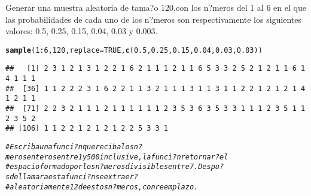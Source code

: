 \documentclass[10pt,a4paper]{article}\usepackage[]{graphicx}\usepackage[]{color}
\makeatletter
\newcommand{\hlnum}[1]{\textcolor[rgb]{0.686,0.059,0.569}{#1}}%
\newcommand{\hlcom}[1]{\textcolor[rgb]{0.678,0.584,0.686}{\textit{#1}}}%
\newcommand{\hlopt}[1]{\textcolor[rgb]{0,0,0}{#1}}%
\newcommand{\hlstd}[1]{\textcolor[rgb]{0.345,0.345,0.345}{#1}}%
\newcommand{\hlkwc}[1]{\textcolor[rgb]{0.333,0.667,0.333}{#1}}%
\newcommand{\hlkwd}[1]{\textcolor[rgb]{0.737,0.353,0.396}{\textbf{#1}}}%
\newenvironment{kframe}{%
 \def\at@end@of@kframe{}%
 \ifinner\ifhmode%
  \def\at@end@of@kframe{\end{minipage}}%
  \begin{minipage}{\columnwidth}%
 \fi\fi%
 \def\FrameCommand##1{\hskip\@totalleftmargin \hskip-\fboxsep
 \colorbox{shadecolor}{##1}\hskip-\fboxsep
     \hskip-\linewidth \hskip-\@totalleftmargin \hskip\columnwidth}%
 \MakeFramed {\advance\hsize-\width
   \@totalleftmargin\z@ \linewidth\hsize
   \@setminipage}}%
 {\par\unskip\endMakeFramed%
 \at@end@of@kframe}
\newenvironment{knitrout}{}{} %
\makeatother
\begin{document}
Generar una muestra aleatoria de tama?o 120,con los n?meros del 1 al 6 en el que las probabilidades de cada uno de los n?meros son respectivamente los siguientes valores: 0.5, 0.25, 0.15, 0.04, 0.03 y 0.003.
\begin{knitrout}
\color{fgcolor}\begin{kframe}
\begin{alltt}
\hlkwd{sample}\hlstd{(}\hlnum{1}\hlopt{:}\hlnum{6}\hlstd{,}\hlnum{120}\hlstd{,}\hlkwc{replace}\hlstd{=}\hlnum{TRUE}\hlstd{,} \hlkwd{c}\hlstd{(}\hlnum{0.5}\hlstd{,}\hlnum{0.25}\hlstd{,}\hlnum{0.15}\hlstd{,}\hlnum{0.04}\hlstd{,}\hlnum{0.03}\hlstd{,}\hlnum{0.03}\hlstd{))}
\end{alltt}
\begin{verbatim}
##   [1] 2 3 1 2 1 3 1 2 2 1 6 2 1 1 1 2 1 1 6 5 3 3 2 5 2 1 2 1 1 6 1 4 1 1 1
##  [36] 1 1 2 2 2 3 1 6 2 2 1 1 3 2 1 1 1 3 1 1 3 1 1 2 2 1 2 1 2 1 4 1 2 1 1
##  [71] 2 2 3 2 1 1 1 2 1 1 1 1 1 1 2 3 5 3 6 3 5 3 3 1 1 1 2 3 5 1 1 2 3 5 2
## [106] 1 1 2 2 1 2 1 2 1 2 2 5 3 3 1
\end{verbatim}
\begin{alltt}
\hlcom{#Escriba una funci?n que reciba los n?meros enteros entre 1 y 500 inclusive, la funci?n retornar? el }
\hlcom{#espacio formado por los n?meros divisibles entre 7.Despu?s de llamar a esta funci?n se extraer? }
\hlcom{#aleatoriamente 12 de estos n?meros, con reemplazo.}


\end{alltt}
\end{kframe}
\end{knitrout}
\end{document}
